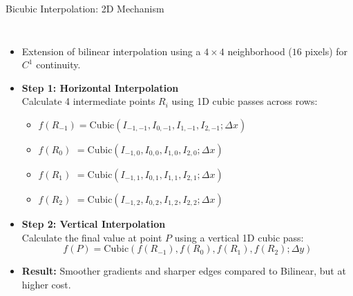 \documentclass[aspectratio=169,10pt]{beamer}
\begin{document}
\begin{frame}{Bicubic Interpolation: 2D Mechanism}
\begin{columns}[T,onlytextwidth]
\small
\begin{itemize}
    \item Extension of bilinear interpolation using a $4\times4$ neighborhood ($16$ pixels) for $C^1$ continuity.
    
    \item \textbf{Step 1: Horizontal Interpolation} \\
    Calculate 4 intermediate points $R_i$ using 1D cubic passes across rows:
    \begin{itemize}
        \scriptsize
        \item $f(R_{-1}) = \text{Cubic}(I_{-1,-1}, I_{0,-1}, I_{1,-1}, I_{2,-1}; \Delta x)$
        \item $f(R_0) \,\,= \text{Cubic}(I_{-1,0}, I_{0,0}, I_{1,0}, I_{2,0}; \Delta x)$
        \item $f(R_1) \,\,= \text{Cubic}(I_{-1,1}, I_{0,1}, I_{1,1}, I_{2,1}; \Delta x)$
        \item $f(R_2) \,\,= \text{Cubic}(I_{-1,2}, I_{0,2}, I_{1,2}, I_{2,2}; \Delta x)$
    \end{itemize}

    \item \textbf{Step 2: Vertical Interpolation} \\
    Calculate the final value at point $P$ using a vertical 1D cubic pass:
    \scriptsize
    \[ f(P) = \text{Cubic}(f(R_{-1}), f(R_0), f(R_1), f(R_2); \Delta y) \]

    \small
    \item \textbf{Result:} Smoother gradients and sharper edges compared to Bilinear, but at higher cost.
\end{itemize}

\centering
{}
\end{columns}
\end{frame}
\end{document}

